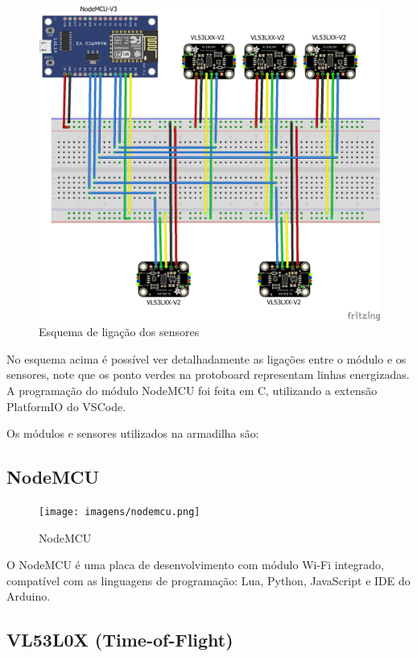 \documentclass[
	12pt,				%
	openright,			%
	oneside,			%
	a4paper,			%
	chapter=TITLE,		%
	english,			%
	brazil				%
	]{abntex2}
\begin{document}
\begin{figure}[H]
    \centering
    \includegraphics[scale=0.9]{imagens/EsquemaHardware.png}
    \caption{Esquema de ligação dos sensores}
    \label{fig:esquemahardware}
\end{figure}   

No esquema acima é possível ver detalhadamente as ligações entre o módulo e os sensores, note que os ponto verdes na protoboard representam 
linhas energizadas. A programação do módulo NodeMCU foi feita em C, utilizando a extensão PlatformIO do VSCode. 

Os módulos e sensores utilizados na armadilha são:

\subsection{NodeMCU}

\begin{figure}[H]
\centering
\texttt{[image: imagens/nodemcu.png]}
\caption{NodeMCU}
    \label{fig:nodemcu}
\end{figure}

O NodeMCU é uma placa de desenvolvimento com módulo Wi-Fi integrado, compatível com as linguagens de programação: Lua, Python, 
JavaScript e IDE do Arduino.


\subsection{VL53L0X (Time-of-Flight)}
\end{document}
